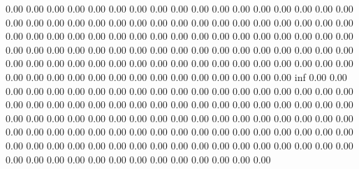     0.00 
    0.00 
    0.00 
    0.00 
    0.00 
    0.00 
    0.00 
    0.00 
    0.00 
    0.00 
    0.00 
    0.00 
    0.00 
    0.00 
    0.00 
    0.00 
    0.00 
    0.00 
    0.00 
    0.00 
    0.00 
    0.00 
    0.00 
    0.00 
    0.00 
    0.00 
    0.00 
    0.00 
    0.00 
    0.00 
    0.00 
    0.00 
    0.00 
    0.00 
    0.00 
    0.00 
    0.00 
    0.00 
    0.00 
    0.00 
    0.00 
    0.00 
    0.00 
    0.00 
    0.00 
    0.00 
    0.00 
    0.00 
    0.00 
    0.00 
    0.00 
    0.00 
    0.00 
    0.00 
    0.00 
    0.00 
    0.00 
    0.00 
    0.00 
    0.00 
    0.00 
    0.00 
    0.00 
    0.00 
    0.00 
    0.00 
    0.00 
    0.00 
    0.00 
    0.00 
    0.00 
    0.00 
    0.00 
    0.00 
    0.00 
    0.00 
    0.00 
    0.00 
    0.00 
    0.00 
    0.00 
    0.00 
    0.00 
    0.00 
    0.00 
    0.00 
    0.00 
    0.00 
    0.00 
    0.00 
    0.00 
    0.00 
    0.00 
    0.00 
    0.00 
    0.00 
    0.00 
    0.00 
    0.00 
     inf 
    0.00 
    0.00 
    0.00 
    0.00 
    0.00 
    0.00 
    0.00 
    0.00 
    0.00 
    0.00 
    0.00 
    0.00 
    0.00 
    0.00 
    0.00 
    0.00 
    0.00 
    0.00 
    0.00 
    0.00 
    0.00 
    0.00 
    0.00 
    0.00 
    0.00 
    0.00 
    0.00 
    0.00 
    0.00 
    0.00 
    0.00 
    0.00 
    0.00 
    0.00 
    0.00 
    0.00 
    0.00 
    0.00 
    0.00 
    0.00 
    0.00 
    0.00 
    0.00 
    0.00 
    0.00 
    0.00 
    0.00 
    0.00 
    0.00 
    0.00 
    0.00 
    0.00 
    0.00 
    0.00 
    0.00 
    0.00 
    0.00 
    0.00 
    0.00 
    0.00 
    0.00 
    0.00 
    0.00 
    0.00 
    0.00 
    0.00 
    0.00 
    0.00 
    0.00 
    0.00 
    0.00 
    0.00 
    0.00 
    0.00 
    0.00 
    0.00 
    0.00 
    0.00 
    0.00 
    0.00 
    0.00 
    0.00 
    0.00 
    0.00 
    0.00 
    0.00 
    0.00 
    0.00 
    0.00 
    0.00 
    0.00 
    0.00 
    0.00 
    0.00 
    0.00 
    0.00 
    0.00 
    0.00 
    0.00 
    0.00 
